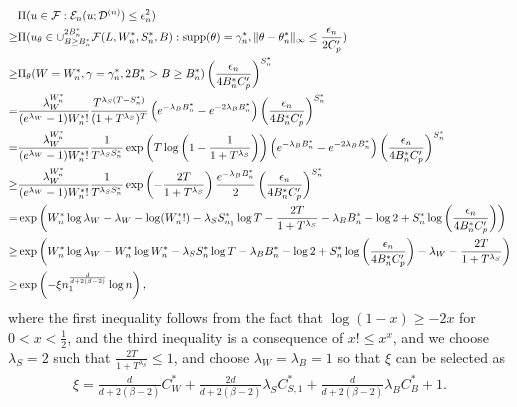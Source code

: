 \documentclass{article}
\newcommand{\supp}{\textnormal{supp}}
\newcommand{\F}{\mathcal{F}}
\newcommand{\D}{\mathcal{D}}
\theoremstyle{plain}
\theoremstyle{definition}
\theoremstyle{remark}
\begin{document}
\begin{align*}
    & \Pi (u \in \F: \mathcal{E}_n(u; \D^{(n)}) \leq \epsilon_n^2) \\
    \geq &  \Pi(u_\theta \in \cup_{B \geq B_{n}^*}^{2 B_{n}^*}\F(L, W_{n}^*, S_{n}^*, B): \supp(\theta) = \gamma_n^*, \|\theta - \theta_{n}^*\|_\infty \leq \frac{\epsilon_n}{2 C_p'} ) \\ \geq &  \Pi_\theta(W = W_n^*, \gamma = \gamma_n^*, 2B_{n}^* > B \geq B_{n}^*)
    \left(\frac{\epsilon_{n}}{4 B_{n}^* C_p'}\right)^{S_{n}^* } \\
    = & \frac{\lambda_W^{W_{n}^*}}{(e^{\lambda_W}-1) W_{n}^* !} \frac{T^{\lambda_S (T-S_{n}^*)}}{(1 + T^{\lambda_S})^T}  \left(e^{-\lambda_B B_{n}^*} - e^{-2\lambda_B B_{n}^*}\right)
    \left(\frac{\epsilon_n}{4 B_{n}^* C_p'}\right)^{S_n^* }\\
    = & \frac{\lambda_W^{W_{n}^*}}{(e^{\lambda_W}-1) W_{n}^* !} \frac{1}{T^{\lambda_S S_{n}^*}} \exp\left(T \log\left(1 - \frac{1}{1 + T^{\lambda_S}}\right)\right)\left(e^{-\lambda_B B_{n}^*} - e^{-2\lambda_B B_{n}^*}\right)\left(\frac{\epsilon_{n}}{4 B_{n}^* C_p'}\right)^{S_{n}^*} \\
    \geq & \frac{\lambda_W^{W_{n}^*}}{(e^{\lambda_W}-1) W_{n}^* !} \frac{1}{T^{\lambda_S S_{n}^*}} \exp \left(- \frac{2 T}{1 + T^{\lambda_S}}\right) \frac{e^{-\lambda_B B_{n}^*}}{2} \left(\frac{\epsilon_{n}}{4 B_{n}^* C_p'}\right)^{S_{n}^* } \\
     = & \exp \left(W_{n}^* \log \lambda_W - \lambda_W -\log (W_{n}^*!) - \lambda_S S_{n_1}^* \log T - \frac{2 T}{1 + T^{\lambda_S}} -\lambda_B B_{n}^* - \log 2 + S_{n}^* \log\left(\frac{\epsilon_{n}}{4 B_{n}^* C_p'}\right) \right) \\
     \geq & \exp  \left(W_{n}^* \log \lambda_W - W_{n}^* \log W_{n}^* - \lambda_S S_{n}^* \log T-\lambda_B B_{n}^* - \log 2 + S_{n}^* \log\left(\frac{\epsilon_{n}}{4 B_{n}^* C_p'}\right) - \lambda_W - \frac{2T}{1 + T^{\lambda_S}}  \right) \\
    \geq & \exp \left(- \xi n_1^{\frac{d}{d+2(\beta-2)}} \log n\right),
 \end{align*}
 where the first inequality follows from the fact that $\log(1 -x ) \geq -2x$ for $0 < x < \frac{1}{2}$, and the third inequality is a consequence of $x! \leq x^x$, and we choose $\lambda_S = 2$ such that $\frac{2T}{1 + T^{\lambda_S}} \leq 1$, and choose $\lambda_W = \lambda_B = 1$ so that $\xi$ can be selected as 
\begin{align*}
    \xi = \frac{d}{d + 2(\beta-2)} C_{W}^* + \frac{2d}{d+ 2(\beta-2)}\lambda_S C_{S, 1}^* + \frac{d}{d + 2(\beta-2)} \lambda_B C_{B}^* + 1. 
\end{align*}
\end{document}
